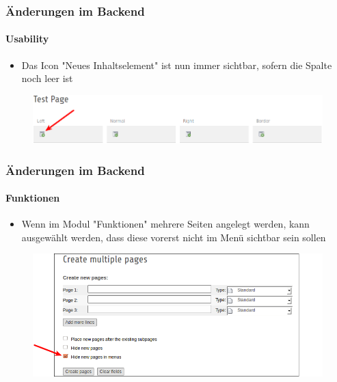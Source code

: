 
\begin{frame}[fragile]
	\frametitle{Änderungen im Backend}
	\framesubtitle{Usability}

 	\begin{itemize}
		\item Das Icon "Neues Inhaltselement" ist nun immer sichtbar, sofern die Spalte noch leer ist
	\end{itemize}

	\begin{figure}
		\includegraphics[width=0.95\linewidth]{Images/BackendChanges/NewContentIconAlwaysVisible.png}
	\end{figure}

\end{frame}


\begin{frame}[fragile]
	\frametitle{Änderungen im Backend}
	\framesubtitle{Funktionen}

 	\begin{itemize}
			\item Wenn im Modul "Funktionen" mehrere Seiten angelegt werden, kann ausgewählt werden, dass diese vorerst nicht im Menü sichtbar sein sollen
	\end{itemize}

	\begin{figure}
		\includegraphics[width=0.85\linewidth]{Images/BackendChanges/CreateMultiplePagesHideInMenu.png}
	\end{figure}

\end{frame}

